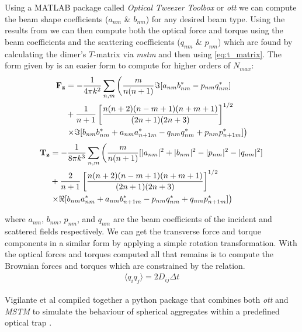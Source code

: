 Using a  MATLAB package called \textit{Optical Tweezer Toolbox} or \textit{ott} \cite{Nieminen2007} we can compute the beam shape coefficients ($a_{nm}$ \& $b_{nm}$)
for any desired beam type. Using the results from \cite{Farsund1996} we can then 
compute both the optical force and torque using the beam coefficients and the 
scattering coefficients ($q_{nm}$ \& $p_{nm}$) which are found by calculating
the dimer's $T$-matrix via \textit{mstm} \cite{Mackowski2011} and then using \eqref{eq:t_matrix}. The form given by \cite{Crichton2000THEMD} is an easier 
form to compute for higher orders of $N_{max}$:
\begin{equation}
\begin{split}
  \bold{F_z}
  &=
    -\frac{1}{4\pi k^2}\sum_{n,m} \left(\frac{m}{n(n+1)}\Im[a_{nm}b^*_{nm}-p_{nm}q^*_{nm}] \right.
  \\ 
  &+\frac{1}{n+1}\left[\frac{n(n+2)(n-m+1)(n+m+1)}{(2n+1)(2n+3)} \right]^{1/2}
  \\
  & \left.\times\Im[b_{nm}b^*_{nm}+a_{nm}a^*_{n+1m}-q_{nm}q^*_{nm}+p_{nm}p^*_{n+1m}] \right)
\end{split}
\end{equation}
\begin{equation}
\begin{split}
  \bold{T_z}
  &=
    -\frac{1}{8\pi k^3}\sum_{n,m} \left(\frac{m}{n(n+1)}[|a_{nm}|^2+|b_{nm}|^2-|p_{nm}|^2-|q_{nm}|^2] \right.
  \\ 
  &+\frac{2}{n+1}\left[\frac{n(n+2)(n-m+1)(n+m+1)}{(2n+1)(2n+3)} \right]^{1/2}
  \\
  & \left.\times\Re[b_{nm}a^*_{nm}+a_{nm}b^*_{n+1m}-p_{nm}q^*_{nm}+q_{nm}p^*_{n+1m}] \right)
\end{split}
\end{equation}

where $a_{nm}$, $b_{nm}$, $p_{nm}$, and $q_{nm}$ are the beam coefficients
of the incident and scattered fields respectively. We can get the transverse 
force and torque components in a similar form by applying a simple rotation 
transformation. With the optical forces and torques computed all that remains
is to compute the Brownian forces and torques which are constrained by the relation.
\begin{align}
	\langle q_iq_j\rangle =2D_{ij}\Delta t
\end{align}

Vigilante et al compiled together a python package that combines both \textit{ott} 
and \textit{MSTM} to simulate the behaviour of spherical aggregates within 
a predefined optical trap \cite{Vigilante2020}. 

